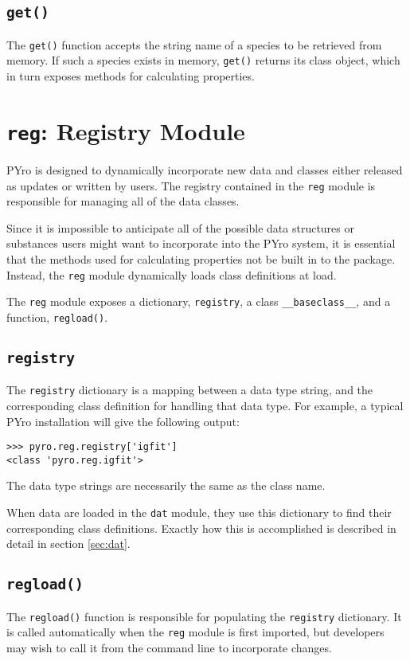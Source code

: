 \subsection{\texttt{get()}}
The \verb|get()| function accepts the string name of a species to be retrieved from memory.  If such a species exists in memory, \verb|get()| returns its class object, which in turn exposes methods for calculating properties.

\section{\texttt{reg}: Registry Module}\label{sec:reg}
PYro is designed to dynamically incorporate new data and classes either released as updates or written by users.  The registry contained in the \verb|reg| module is responsible for managing all of the data classes.

Since it is impossible to anticipate all of the possible data structures or substances users might want to incorporate into the PYro system, it is essential that the methods used for calculating properties not be built in to the package.  Instead, the \verb|reg| module dynamically loads class definitions at load.

The \verb|reg| module exposes a dictionary, \verb|registry|, a class \verb|__baseclass__|, and a function, \verb|regload()|.  

\subsection{\texttt{registry}}
The \verb|registry| dictionary is a mapping between a data type string, and the corresponding class definition for handling that data type.  For example, a typical PYro installation will give the following output:
\begin{verbatim}
>>> pyro.reg.registry['igfit']
<class 'pyro.reg.igfit'>
\end{verbatim}
The data type strings are necessarily the same as the class name.

When data are loaded in the \verb|dat| module, they use this dictionary to find their corresponding class definitions.  Exactly how this is accomplished is described in detail in section \ref{sec:dat}.


\subsection{\texttt{regload()}}
The \verb|regload()| function is responsible for populating the \verb|registry| dictionary.  It is called automatically when the \verb|reg| module is first imported, but developers may wish to call it from the command line to incorporate changes.

